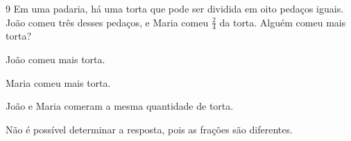 





\num{9} Em uma padaria, há uma torta que pode ser dividida em oito pedaços
iguais. João comeu três desses pedaços, e Maria comeu $\frac{2}{4}$ da torta.
Alguém comeu mais torta?

\begin{escolha}
\item João comeu mais torta.
\item Maria comeu mais torta.
\item João e Maria comeram a mesma quantidade de torta.
\item Não é possível determinar a resposta, pois as frações são diferentes.
\end{escolha}








